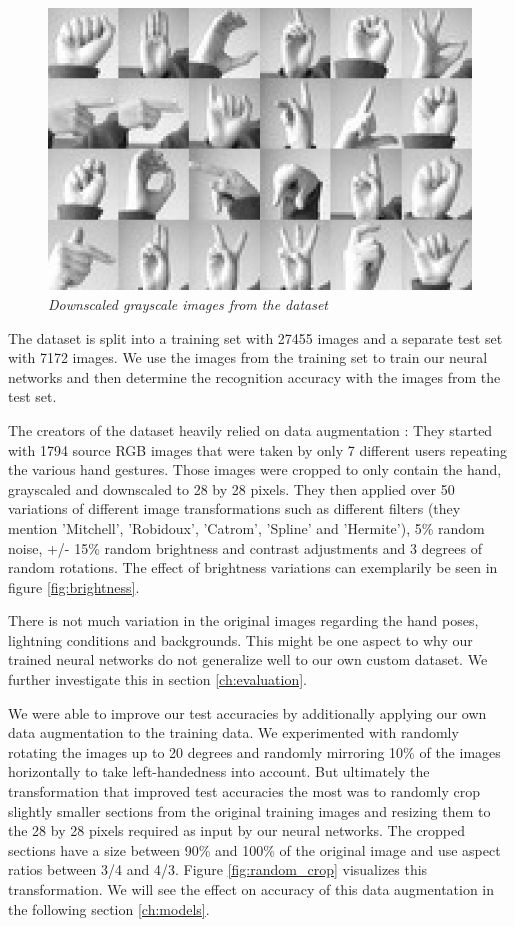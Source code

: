 \documentclass[a4paper]{article}
\begin{document}
\begin{figure}
     \centering
     \includegraphics[width=1\linewidth]{graphics/dataset/amer_sign3.png}
     \caption{\textit{Downscaled grayscale images from the dataset \cite{DatasetKaggle}}}
     \label{fig:full_grayscale}
\end{figure}

The dataset is split into a training set with 27455 images and a separate test set with 7172 images. We use the images from the training set to train our neural networks and then determine the recognition accuracy with the images from the test set.

The creators of the dataset heavily relied on data augmentation \cite{DatasetKaggle}: They started with 1794 source RGB images that were taken by only 7 different users repeating the various hand gestures. Those images were cropped to only contain the hand, grayscaled and downscaled to 28 by 28 pixels. They then applied over 50 variations of different image transformations such as different filters (they mention 'Mitchell', 'Robidoux', 'Catrom', 'Spline' and 'Hermite'), 5\% random noise, +/- 15\% random brightness and contrast adjustments and 3 degrees of random rotations. The effect of brightness variations can exemplarily be seen in figure \ref{fig:brightness}.

There is not much variation in the original images regarding the hand poses, lightning conditions and backgrounds. This might be one aspect to why our trained neural networks do not generalize well to our own custom dataset. We further investigate this in section \ref{ch:evaluation}.

We were able to improve our test accuracies by additionally applying our own data augmentation to the training data. We experimented with randomly rotating the images up to 20 degrees and randomly mirroring 10\% of the images horizontally to take left-handedness into account. But ultimately the transformation that improved test accuracies the most was to randomly crop slightly smaller sections from the original training images and resizing them to the 28 by 28 pixels required as input by our neural networks. The cropped sections have a size between 90\% and 100\% of the original image and use aspect ratios between 3/4 and 4/3. Figure \ref{fig:random_crop} visualizes this transformation. We will see the effect on accuracy of this data augmentation in the following section \ref{ch:models}.
\end{document}
